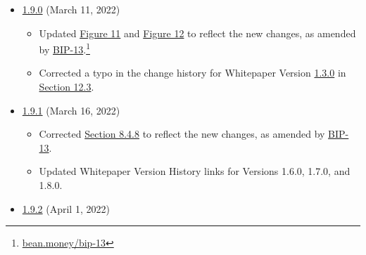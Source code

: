 \documentclass[class=article, crop=false]{standalone}
\begin{document}
\begin{itemize}[topsep=0pt, itemsep=3pt,leftmargin=16pt]
    \item \href{https://github.com/BeanstalkFarms/Beanstalk-Whitepaper/blob/master/version-history/beanstalk1_9_0.pdf}{1.9.0} (March 11, 2022)
    
    \begin{itemize}
        \item Updated \hyperref[fig 11]{Figure 11} and \hyperref[fig 12]{Figure 12} to reflect the new  changes, as amended by \href{https://bean.money/bip-13}{BIP-13}.\footnote{\href{https://bean.money/bip-13}{bean.money/bip-13}}
        \item Corrected a typo in the change history for Whitepaper Version \href{https://github.com/BeanstalkFarms/Beanstalk-Whitepaper/blob/master/version-history/beanstalk1_3_0.pdf}{1.3.0} in \hyperlink{subsection.12.3}{Section 12.3}.
    \end{itemize}
    
    \item \href{https://github.com/BeanstalkFarms/Beanstalk-Whitepaper/blob/master/version-history/beanstalk1_9_1.pdf}{1.9.1} (March 16, 2022)
        
    \begin{itemize}
        \item Corrected \hyperlink{subsubsection.8.4.8}{Section 8.4.8} to reflect the new  changes, as amended by \href{https://bean.money/bip-13}{BIP-13}.
        \item Updated Whitepaper Version History links for Versions 1.6.0, 1.7.0, and 1.8.0.
    \end{itemize}
    
    \item \href{https://github.com/BeanstalkFarms/Beanstalk-Whitepaper/blob/master/version-history/beanstalk1_9_2.pdf}{1.9.2} (April 1, 2022)
    

\end{itemize}
\end{document}
